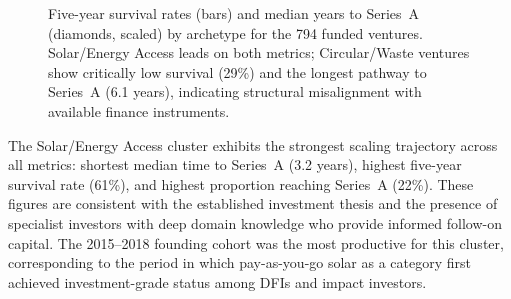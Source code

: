 \documentclass[review,12pt]{elsarticle}
\begin{document}
\begin{figure}[htbp]
\centering
{}
\caption{Five-year survival rates (bars) and median years to Series~A (diamonds, scaled) by archetype for the 794 funded ventures. Solar/Energy Access leads on both metrics; Circular/Waste ventures show critically low survival (29\%) and the longest pathway to Series~A (6.1 years), indicating structural misalignment with available finance instruments.}
\label{fig:scaling}
\end{figure}

The Solar/Energy Access cluster exhibits the strongest scaling
trajectory across all metrics: shortest median time to Series~A
(3.2 years), highest five-year survival rate (61\%), and highest
proportion reaching Series~A (22\%). These figures are consistent
with the established investment thesis and the presence of specialist
investors with deep domain knowledge who provide informed follow-on
capital. The 2015--2018 founding cohort was the most productive for
this cluster, corresponding to the period in which pay-as-you-go
solar as a category first achieved investment-grade status among DFIs
and impact investors.
\end{document}
